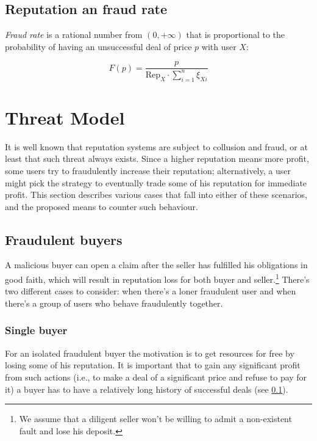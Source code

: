 \documentclass[11pt]{article}
\begin{document}
\bigskip

\subsection{Reputation an fraud rate} \label{reputation:fraudRate}

\textit{Fraud rate} is a rational number from $ (0, +\infty) $ that is proportional to the probability of having an unsuccessful deal of price $ p $ with user $ X $:

\begin{equation} \label{reputationFunction}
F(p) = \frac{p}{\text{Rep}_X \cdot \sum_{i=1}^{n}\xi_{Xi}}
\end{equation}

\section{Threat Model} \label{threatModel}

It is well known \cite{ciccarelli2011collusion, maranzato2010fraud} that reputation systems are subject to collusion and fraud, or at least that such threat always exists. Since a higher reputation means more profit, some users try to fraudulently increase their reputation; alternatively, a user might
pick the strategy to eventually trade some of his reputation for immediate profit. This section describes various cases that fall into either of these scenarios, and the proposed means to counter such behaviour.

\subsection{Fraudulent buyers} \label{threatModel:buyers}

A malicious buyer can open a claim after the seller has fulfilled his obligations in good faith, which will result in reputation loss for both buyer and seller.\footnote{We assume that a diligent seller won't be willing to admit a non-existent fault and lose his deposit.} There's two different cases to consider: when there's a loner fraudulent user and when there's a group of users who behave fraudulently together.

\subsubsection{Single buyer} \label{threatModel:buyers:single}

For an isolated fraudulent buyer the motivation is to get resources for free by losing some of his reputation. It is important that to gain any significant profit from such actions (i.e., to make a deal of a significant price and refuse to pay for it) a buyer has to have a relatively long history of successful deals (see \ref{reputation:fraudRate}).
\end{document}
